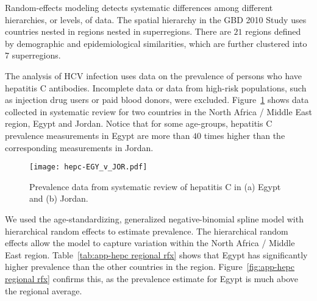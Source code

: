Random-effects modeling detects systematic differences among different
hierarchies, or levels, of data.  The spatial hierarchy in the GBD
2010 Study uses countries nested in regions nested in superregions.
There are $21$ regions defined by demographic and epidemiological
similarities, which are further clustered into $7$ superregions.

The analysis of HCV infection uses data on the prevalence of persons who
have hepatitis C antibodies.  Incomplete data or data from high-risk
populations, such as injection drug users or paid blood donors, were excluded.
Figure~\ref{fig:app-hepc data} shows data collected in systematic
review for two countries in the North Africa / Middle East region, Egypt
and Jordan.  Notice that for some age-groups, hepatitis C prevalence
measurements in Egypt are more than $40$ times higher than the corresponding measurements in
Jordan.

    \begin{figure}[h]
        \begin{center}
            \texttt{[image: hepc-EGY\_v\_JOR.pdf]}
            \caption{Prevalence data from systematic review of
              hepatitis C in (a) Egypt and (b) Jordan.}
            \label{fig:app-hepc data}
        \end{center}
    \end{figure}

We used the age-standardizing, generalized negative-binomial spline
model with hierarchical random effects to estimate prevalence.  The
hierarchical random effects allow the model to capture variation
within the North Africa / Middle East region.
Table~\ref{tab:app-hepc regional rfx} shows that Egypt has significantly
higher prevalence than the other countries in the region.
Figure~\ref{fig:app-hepc regional rfx} confirms this, as the prevalence
estimate for Egypt is much above the regional average.

